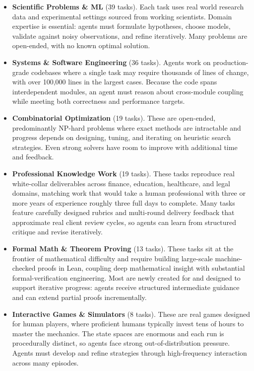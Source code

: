 \begin{itemize}
    \item \textbf{Scientific Problems \& ML} (39 tasks). Each task uses real world research data and experimental settings sourced from working scientists. Domain expertise is essential: agents must formulate hypotheses, choose models, validate against noisy observations, and refine iteratively. Many problems are open-ended, with no known optimal solution.

    \item \textbf{Systems \& Software Engineering} (36 tasks). Agents work on production-grade codebases where a single task may require thousands of lines of change, with over 100{,}000 lines in the largest cases. Because the code spans interdependent modules, an agent must reason about cross-module coupling while meeting both correctness and performance targets.

    \item \textbf{Combinatorial Optimization} (19 tasks). These are open-ended, predominantly NP-hard problems where exact methods are intractable and progress depends on designing, tuning, and iterating on heuristic search strategies. Even strong solvers have room to improve with additional time and feedback.

    \item \textbf{Professional Knowledge Work} (19 tasks). These tasks reproduce real white-collar deliverables across finance, education, healthcare, and legal domains, matching work that would take a human professional with three or more years of experience roughly three full days to complete. Many tasks feature carefully designed rubrics and multi-round delivery feedback that approximate real client review cycles, so agents can learn from structured critique and revise iteratively.

    \item \textbf{Formal Math \& Theorem Proving} (13 tasks). These tasks sit at the frontier of mathematical difficulty and require building large-scale machine-checked proofs in Lean, coupling deep mathematical insight with substantial formal-verification engineering. Most are newly created for \benchmark{} and designed to support iterative progress: agents receive structured intermediate guidance and can extend partial proofs incrementally.

    \item \textbf{Interactive Games \& Simulators} (8 tasks). These are real games designed for human players, where proficient humans typically invest tens of hours to master the mechanics. The state spaces are enormous and each run is procedurally distinct, so agents face strong out-of-distribution pressure. Agents must develop and refine strategies through high-frequency interaction across many episodes.
\end{itemize}

